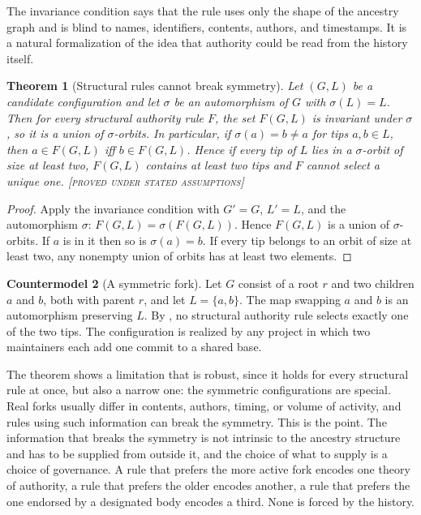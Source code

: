 \documentclass[11pt,twoside,openright]{book}
\theoremstyle{plain}
\newtheorem{theorem}{Theorem}[chapter]
\theoremstyle{definition}
\newtheorem{countermodel}[theorem]{Countermodel}
\theoremstyle{remark}
\newcommand{\Proved}{\textup{\textsc{[proved under stated assumptions]}}}
\begin{document}
The invariance condition says that the rule uses only the shape of the ancestry graph and is blind to names, identifiers, contents, authors, and timestamps. It is a natural formalization of the idea that authority could be read from the history itself.

\begin{theorem}[Structural rules cannot break symmetry]\label{thm:symmetry}
Let $(G,L)$ be a candidate configuration and let $\sigma$ be an automorphism of $G$ with $\sigma(L)=L$. Then for every structural authority rule $F$, the set $F(G,L)$ is invariant under $\sigma$, so it is a union of $\sigma$-orbits. In particular, if $\sigma(a)=b\neq a$ for tips $a,b\in L$, then $a\in F(G,L)$ iff $b\in F(G,L)$. Hence if every tip of $L$ lies in a $\sigma$-orbit of size at least two, $F(G,L)$ contains at least two tips and $F$ cannot select a unique one.
\Proved{}
\end{theorem}

\begin{proof}
Apply the invariance condition with $G'=G$, $L'=L$, and the automorphism $\sigma$: $F(G,L)=\sigma(F(G,L))$. Hence $F(G,L)$ is a union of $\sigma$-orbits. If $a$ is in it then so is $\sigma(a)=b$. If every tip belongs to an orbit of size at least two, any nonempty union of orbits has at least two elements.
\end{proof}

\begin{countermodel}[A symmetric fork]\label{cm:symfork}
Let $G$ consist of a root $r$ and two children $a$ and $b$, both with parent $r$, and let $L=\{a,b\}$. The map swapping $a$ and $b$ is an automorphism preserving $L$. By , no structural authority rule selects exactly one of the two tips. The configuration is realized by any project in which two maintainers each add one commit to a shared base.
\end{countermodel}

The theorem shows a limitation that is robust, since it holds for every structural rule at once, but also a narrow one: the symmetric configurations are special. Real forks usually differ in contents, authors, timing, or volume of activity, and rules using such information can break the symmetry. This is the point. The information that breaks the symmetry is not intrinsic to the ancestry structure and has to be supplied from outside it, and the choice of what to supply is a choice of governance. A rule that prefers the more active fork encodes one theory of authority, a rule that prefers the older encodes another, a rule that prefers the one endorsed by a designated body encodes a third. None is forced by the history.
\end{document}
